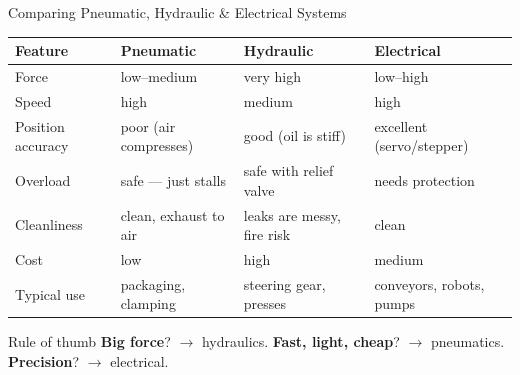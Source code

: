 \documentclass[aspectratio=169]{beamer}
\begin{document}
	\begin{frame}{Comparing Pneumatic, Hydraulic \& Electrical Systems}
		\renewcommand{\arraystretch}{1.12}
		\centering
		\small
		\begin{tabular}{@{}>{\raggedright}p{2.8cm}>{\raggedright}p{3.4cm}>{\raggedright}p{3.4cm}>{\raggedright\arraybackslash}p{3.4cm}@{}}
			\toprule
			\textbf{Feature} & \textbf{Pneumatic} & \textbf{Hydraulic} & \textbf{Electrical} \\
			\midrule
			Force            & low--medium             & very high               & low--high \\
			Speed            & high                    & medium                  & high \\
			Position accuracy& poor (air compresses)   & good (oil is stiff)     & excellent (servo/stepper) \\
			Overload         & safe --- just stalls    & safe with relief valve  & needs protection \\
			Cleanliness      & clean, exhaust to air   & leaks are messy, fire risk & clean \\
			Cost             & low                     & high                    & medium \\
			Typical use      & packaging, clamping     & steering gear, presses  & conveyors, robots, pumps \\
			\bottomrule
		\end{tabular}
		\vspace{0.1cm}
		\begin{block}{Rule of thumb}
			\small \textbf{Big force}? $\rightarrow$ hydraulics. \quad \textbf{Fast, light, cheap}? $\rightarrow$ pneumatics. \quad \textbf{Precision}? $\rightarrow$ electrical.
		\end{block}
	\end{frame}

\end{document}
